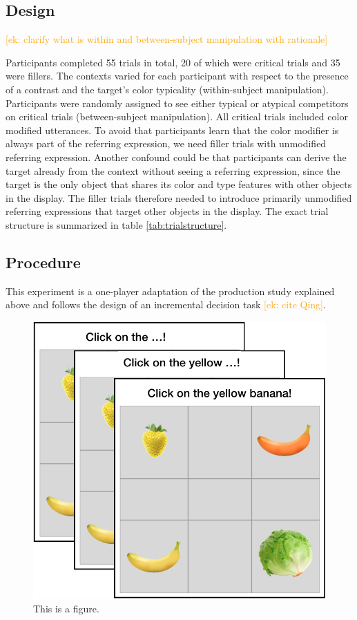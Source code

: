 \documentclass[10pt,letterpaper]{article}
\newcommand{\ek}[1]{\textcolor{Orange}{[ek: #1]}}
\begin{document}
\subsection{Design}
\ek{clarify what is within and between-subject manipulation with rationale}

Participants completed 55 trials in total, 20 of which were critical trials and 35 were fillers. The contexts varied for each participant with respect to the presence of a contrast and the target's color typicality (within-subject manipulation). Participants were randomly assigned to see either typical or atypical competitors on critical trials (between-subject manipulation). All critical trials included color modified utterances. To avoid that participants learn that the color modifier is always part of the referring expression, we need filler trials with unmodified referring expression. Another confound could be that participants can derive the target already from the context without seeing a referring expression, since the target is the only object that shares its color and type features with other objects in the display. The filler trials therefore needed to introduce primarily unmodified referring expressions that target other objects in the display. The exact trial structure is summarized in table \ref{tab:trialstructure}.


\subsection{Procedure}
This experiment is a one-player adaptation of the production study explained above and follows the design of an incremental decision task \ek{cite Qing}. 

\begin{figure}
	\begin{center}
		\includegraphics[width=.4\textwidth]{graphs/IDT-design.pdf}
	\end{center}
\caption{This is a figure.} 
\label{prod-results}
\end{figure}
\end{document}
